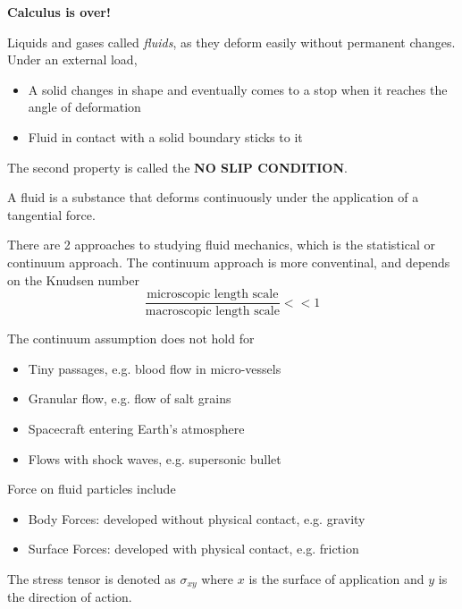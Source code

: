 \documentclass[12pt]{article}
\begin{document}
\textbf{Calculus is over!}

Liquids and gases called \emph{fluids}, as they deform easily without permanent changes. Under an external load,
\begin{itemize}
	\item A solid changes in shape and eventually comes to a stop when it reaches the angle of deformation
	\item Fluid in contact with a solid boundary sticks to it
\end{itemize}
The second property is called the \textbf{NO SLIP CONDITION}.

\begin{defn}
	A fluid is a substance that deforms continuously under the application of a tangential force.
\end{defn}

There are 2 approaches to studying fluid mechanics, which is the statistical or continuum approach. The continuum approach is more conventinal, and depends on the Knudsen number
$$\frac{\text{microscopic length scale}}{\text{macroscopic length scale}} << 1$$

The continuum assumption does not hold for
\begin{itemize}
	\item Tiny passages, e.g. blood flow in micro-vessels
	\item Granular flow, e.g. flow of salt grains
	\item Spacecraft entering Earth's atmosphere
	\item Flows with shock waves, e.g. supersonic bullet
\end{itemize}

Force on fluid particles include
\begin{itemize}
	\item Body Forces: developed without physical contact, e.g. gravity
	\item Surface Forces: developed with physical contact, e.g. friction
\end{itemize}

The stress tensor is denoted as $\sigma_{xy}$ where $x$ is the surface of application and $y$ is the direction of action.
\end{document}
